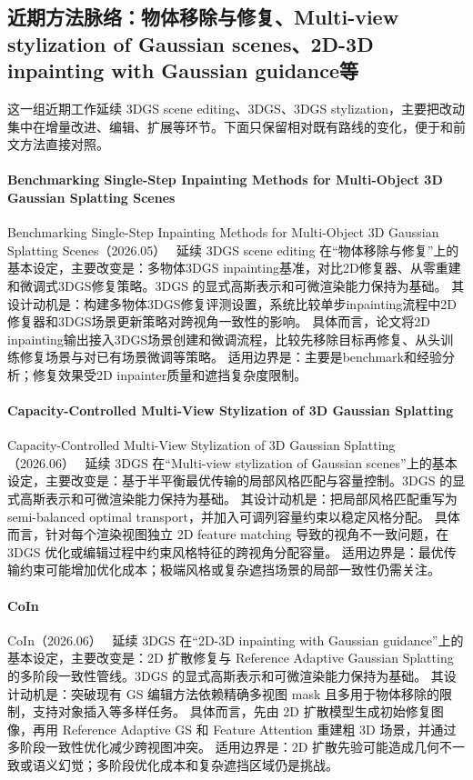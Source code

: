 \subsection{近期方法脉络：物体移除与修复、Multi-view stylization of Gaussian scenes、2D-3D inpainting with Gaussian guidance等}

这一组近期工作延续 3DGS scene editing、3DGS、3DGS stylization，主要把改动集中在增量改进、编辑、扩展等环节。下面只保留相对既有路线的变化，便于和前文方法直接对照。

\paragraph{Benchmarking Single-Step Inpainting Methods for Multi-Object 3D Gaussian Splatting Scenes}
Benchmarking Single-Step Inpainting Methods for Multi-Object 3D Gaussian Splatting Scenes（2026.05）~\cite{2605_30987} 延续 3DGS scene editing 在“物体移除与修复”上的基本设定，主要改变是：多物体3DGS inpainting基准，对比2D修复器、从零重建和微调式3DGS修复策略。3DGS 的显式高斯表示和可微渲染能力保持为基础。
其设计动机是：构建多物体3DGS修复评测设置，系统比较单步inpainting流程中2D修复器和3DGS场景更新策略对跨视角一致性的影响。
具体而言，论文将2D inpainting输出接入3DGS场景创建和微调流程，比较先移除目标再修复、从头训练修复场景与对已有场景微调等策略。
适用边界是：主要是benchmark和经验分析；修复效果受2D inpainter质量和遮挡复杂度限制。

\paragraph{Capacity-Controlled Multi-View Stylization of 3D Gaussian Splatting}
Capacity-Controlled Multi-View Stylization of 3D Gaussian Splatting（2026.06）~\cite{2606_26754} 延续 3DGS 在“Multi-view stylization of Gaussian scenes”上的基本设定，主要改变是：基于半平衡最优传输的局部风格匹配与容量控制。3DGS 的显式高斯表示和可微渲染能力保持为基础。
其设计动机是：把局部风格匹配重写为 semi-balanced optimal transport，并加入可调列容量约束以稳定风格分配。
具体而言，针对每个渲染视图独立 2D feature matching 导致的视角不一致问题，在 3DGS 优化或编辑过程中约束风格特征的跨视角分配容量。
适用边界是：最优传输约束可能增加优化成本；极端风格或复杂遮挡场景的局部一致性仍需关注。

\paragraph{CoIn}
CoIn（2026.06）~\cite{2606_27584} 延续 3DGS 在“2D-3D inpainting with Gaussian guidance”上的基本设定，主要改变是：2D 扩散修复与 Reference Adaptive Gaussian Splatting 的多阶段一致性管线。3DGS 的显式高斯表示和可微渲染能力保持为基础。
其设计动机是：突破现有 GS 编辑方法依赖精确多视图 mask 且多用于物体移除的限制，支持对象插入等多样任务。
具体而言，先由 2D 扩散模型生成初始修复图像，再用 Reference Adaptive GS 和 Feature Attention 重建粗 3D 场景，并通过多阶段一致性优化减少跨视图冲突。
适用边界是：2D 扩散先验可能造成几何不一致或语义幻觉；多阶段优化成本和复杂遮挡区域仍是挑战。

